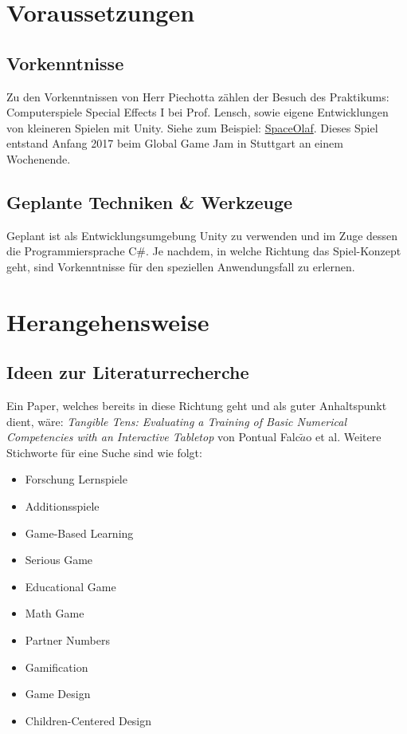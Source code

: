 \documentclass[a4paper]{article}
\begin{document}
\section{Voraussetzungen}

\subsection{Vorkenntnisse}
Zu den Vorkenntnissen von Herr Piechotta zählen der Besuch des Praktikums: Computerspiele Special Effects I bei Prof. Lensch, sowie eigene Entwicklungen von kleineren Spielen mit Unity. Siehe zum Beispiel: \href{https://globalgamejam.org/2017/games/spaceolaf}{SpaceOlaf}. Dieses Spiel entstand Anfang 2017 beim Global Game Jam in Stuttgart an einem Wochenende.

\subsection{Geplante Techniken \& Werkzeuge}
Geplant ist als Entwicklungsumgebung Unity zu verwenden und im Zuge dessen die Programmiersprache C\#. Je nachdem, in welche Richtung das Spiel-Konzept geht, sind Vorkenntnisse für den speziellen Anwendungsfall zu erlernen.

\section{Herangehensweise}

\subsection{Ideen zur Literaturrecherche}
Ein Paper, welches bereits in diese Richtung geht und als guter Anhaltspunkt dient, wäre: \textit{Tangible Tens: Evaluating a Training of Basic Numerical Competencies with an Interactive Tabletop} von Pontual Falc$ \tilde{a} $o et al.
Weitere Stichworte für eine Suche sind wie folgt:\\
\begin{itemize}
\item Forschung Lernspiele
\item Additionsspiele
\item Game-Based Learning
\item Serious Game
\item Educational Game
\item Math Game
\item Partner Numbers
\item Gamification
\item Game Design
\item Children-Centered Design
\end{itemize}
\end{document}

